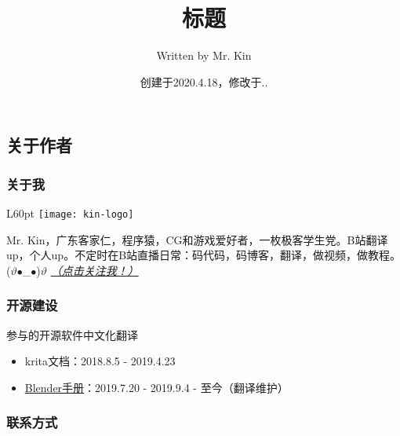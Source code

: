 \documentclass[11pt,a4paper,UTF8,titlepage]{ctexrep} %
\title{\hypertarget{title}{\textbf{标题}}}
\author{Written by Mr. Kin}
\date{创建于2020.4.18，修改于\number\year.\number\month.\number\day}
\makeatletter
\renewcommand{\tableofcontents}%
  {\chapter{\contentsname}%
  \@mkboth{\MakeUppercase\contentsname}{\MakeUppercase\contentsname}%
  \@makeschapterhead{\sourcecodename}%
  \@starttoc{toc}%
}
\makeatother
\begin{document}
    \maketitle %
    {\centering \tableofcontents} %
    \clearpage %
    \fi

    \section*{\bfseries \sffamily 关于作者}

    \subsection*{\bfseries \sffamily 关于我}
    \begin{wrapfigure}[3]{L}{60pt}
        \vspace*{-20pt}
        \centering
        \texttt{[image: kin-logo]}
    \end{wrapfigure}
    Mr. Kin，广东客家仁，程序猿，CG和游戏爱好者，一枚极客学生党。B站翻译up，个人up。不定时在B站直播日常：码代码，码博客，翻译，做视频，做教程。 ($\vartheta$$\bullet$\_$\bullet$)$\vartheta$ \hyperlink{follow}{\emph{（点击关注我！）}}

    \subsection*{\bfseries \sffamily 开源建设}

    \noindent 参与的开源软件中文化翻译

    \begin{itemize}
        \item krita文档：2018.8.5 - 2019.4.23
        \item \href{https://www.blendercn.org/5812.html?tdsourcetag=s_pctim_aiomsg}{Blender手册}：2019.7.20 - 2019.9.4 - 至今（翻译维护）
    \end{itemize}

    \subsection*{\bfseries \sffamily \hypertarget{contact}{联系方式}}
    \vspace*{-1ex}
\end{document}
